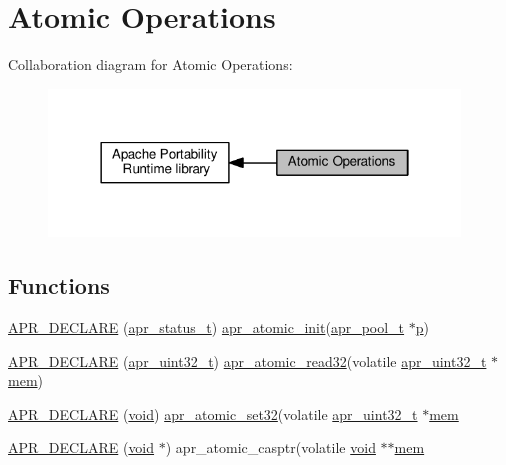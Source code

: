 \hypertarget{group__apr__atomic}{}\section{Atomic Operations}
\label{group__apr__atomic}
Collaboration diagram for Atomic Operations\+:
\nopagebreak
\begin{figure}[H]
\begin{center}
\leavevmode
\includegraphics[width=310pt]{group__apr__atomic}
\end{center}
\end{figure}
\subsection*{Functions}
\begin{DoxyCompactItemize}
\item 
\hyperlink{group__apr__atomic_ga65b255e69a9dd98b377d65af6784123a}{A\+P\+R\+\_\+\+D\+E\+C\+L\+A\+RE} (\hyperlink{group__apr__errno_gaa5105fa83cc322f09382292db8b47593}{apr\+\_\+status\+\_\+t}) \hyperlink{atomic_8c_aa89b4022de39ca4d1c2ae6715e888e97}{apr\+\_\+atomic\+\_\+init}(\hyperlink{structapr__pool__t}{apr\+\_\+pool\+\_\+t} $\ast$\hyperlink{group__APACHE__CORE__MPM_ga5cd91701e5c167f2b1a38e70ab57817e}{p})
\item 
\hyperlink{group__apr__atomic_ga37c009c5dd358d0c58afdb893b474d33}{A\+P\+R\+\_\+\+D\+E\+C\+L\+A\+RE} (\hyperlink{group__apr__platform_ga558548a135d8a816c4787250744ea147}{apr\+\_\+uint32\+\_\+t}) \hyperlink{atomic_8c_afba4de90e113d26536cff48418689771}{apr\+\_\+atomic\+\_\+read32}(volatile \hyperlink{group__apr__platform_ga558548a135d8a816c4787250744ea147}{apr\+\_\+uint32\+\_\+t} $\ast$\hyperlink{group__apr__skiplist_ga5f00e9b1b039412bb144bae39e66b97a}{mem})
\item 
\hyperlink{group__apr__atomic_ga1a5949fac9f4eff129304402ce63d0da}{A\+P\+R\+\_\+\+D\+E\+C\+L\+A\+RE} (\hyperlink{group__MOD__ISAPI_gacd6cdbf73df3d9eed42fa493d9b621a6}{void}) \hyperlink{atomic_8c_ac689de9df18c093f66959227359328bb}{apr\+\_\+atomic\+\_\+set32}(volatile \hyperlink{group__apr__platform_ga558548a135d8a816c4787250744ea147}{apr\+\_\+uint32\+\_\+t} $\ast$\hyperlink{group__apr__skiplist_ga5f00e9b1b039412bb144bae39e66b97a}{mem}
\item 
\hyperlink{group__apr__atomic_ga9655776a872ec2cd6ead60bc69ddd923}{A\+P\+R\+\_\+\+D\+E\+C\+L\+A\+RE} (\hyperlink{group__MOD__ISAPI_gacd6cdbf73df3d9eed42fa493d9b621a6}{void} $\ast$) apr\+\_\+atomic\+\_\+casptr(volatile \hyperlink{group__MOD__ISAPI_gacd6cdbf73df3d9eed42fa493d9b621a6}{void} $\ast$$\ast$\hyperlink{group__apr__skiplist_ga5f00e9b1b039412bb144bae39e66b97a}{mem}
\end{DoxyCompactItemize}
